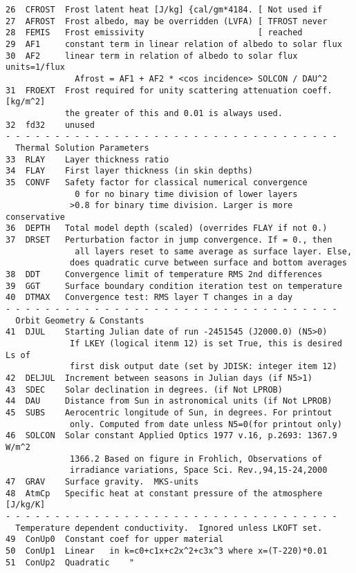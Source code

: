 \documentclass[draft]{article}  %
\begin{document}
\begin{verbatim}
26  CFROST  Frost latent heat [J/kg] {cal/gm*4184. [ Not used if
27  AFROST  Frost albedo, may be overridden (LVFA) [ TFROST never
28  FEMIS   Frost emissivity                       [ reached
29  AF1     constant term in linear relation of albedo to solar flux
30  AF2     linear term in relation of albedo to solar flux units=1/flux
              Afrost = AF1 + AF2 * <cos incidence> SOLCON / DAU^2
31  FROEXT  Frost required for unity scattering attenuation coeff. [kg/m^2]
            the greater of this and 0.01 is always used.
32  fd32    unused
- - - - - - - - - - - - - - - - - - - - - - - - - - - - - - - - - - 
  Thermal Solution Parameters
33  RLAY    Layer thickness ratio
34  FLAY    First layer thickness (in skin depths)
35  CONVF   Safety factor for classical numerical convergence
              0 for no binary time division of lower layers
             >0.8 for binary time division. Larger is more conservative
36  DEPTH   Total model depth (scaled) (overrides FLAY if not 0.)
37  DRSET   Perturbation factor in jump convergence. If = 0., then
              all layers reset to same average as surface layer. Else,
             does quadratic curve between surface and bottom averages
38  DDT     Convergence limit of temperature RMS 2nd differences
39  GGT     Surface boundary condition iteration test on temperature
40  DTMAX   Convergence test: RMS layer T changes in a day
- - - - - - - - - - - - - - - - - - - - - - - - - - - - - - - - - - 
  Orbit Geometry & Constants
41  DJUL    Starting Julian date of run -2451545 (J2000.0) (N5>0)
             If LKEY (logical itenm 12) is set True, this is desired Ls of 
             first disk output date (set by JDISK: integer item 12)
42  DELJUL  Increment between seasons in Julian days (if N5>1)
43  SDEC    Solar declination in degrees. (if Not LPROB)
44  DAU     Distance from Sun in astronomical units (if Not LPROB)
45  SUBS    Aerocentric longitude of Sun, in degrees. For printout 
             only. Computed from date unless N5=0(for printout only)
46  SOLCON  Solar constant Applied Optics 1977 v.16, p.2693: 1367.9 W/m^2
             1366.2 Based on figure in Frohlich, Observations of 
             irradiance variations, Space Sci. Rev.,94,15-24,2000
47  GRAV    Surface gravity.  MKS-units
48  AtmCp   Specific heat at constant pressure of the atmosphere [J/kg/K]
- - - - - - - - - - - - - - - - - - - - - - - - - - - - - - - - - - 
  Temperature dependent conductivity.  Ignored unless LKOFT set.
49  ConUp0  Constant coef for upper material 
50  ConUp1  Linear   in k=c0+c1x+c2x^2+c3x^3 where x=(T-220)*0.01
51  ConUp2  Quadratic    " 

\end{verbatim}
\end{document}
